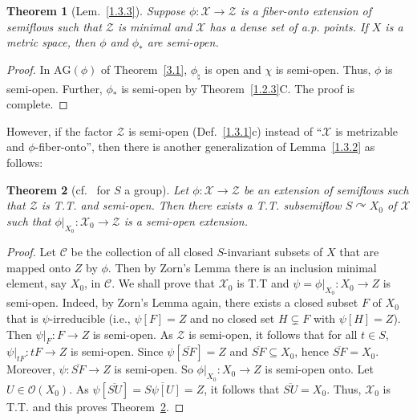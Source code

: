 \documentclass[12pt,final,3p,times]{elsarticle}
\newtheorem{thm}{Theorem}[section]
\theoremstyle{definition}
\numberwithin{equation}{section}
\begin{document}
\begin{thm}[Lem.~\ref{1.3.3}]\label{3.2}
Suppose $\phi\colon\mathscr{X}\rightarrow\mathscr{Z}$ is a fiber-onto extension of semiflows such that $\mathscr{Z}$ is minimal and $\mathscr{X}$ has a dense set of a.p. points. If $X$ is a metric space, then $\phi$ and $\phi_*$ are semi-open.
\end{thm}

\begin{proof}
    In $\mathrm{AG}(\phi)$ of Theorem~\ref{3.1}, $\phi_\natural$ is open and $\chi$ is semi-open. Thus, $\phi$ is semi-open. Further, $\phi_*$ is semi-open by Theorem~\ref{1.2.3}C. The proof is complete.
\end{proof}

However, if the factor $\mathscr{Z}$ is semi-open (Def.~\ref{1.3.1}c) instead of ``$\mathscr{X}$ is metrizable and $\phi$-fiber-onto'', then there is another generalization of Lemma~\ref{1.3.2} as follows:

\begin{thm}[{cf.~\cite[Thm.~2.5]{W85} for $S$ a group}]\label{3.3}
Let $\phi\colon\mathscr{X}\rightarrow \mathscr{Z}$ be an extension of semiflows such that $\mathscr{Z}$ is T.T. and semi-open. Then there exists a T.T. subsemiflow $S\curvearrowright X_0$ of $\mathscr{X}$ such that $\phi|_{X_0}\colon\mathscr{X}_0\rightarrow\mathscr{Z}$ is a semi-open extension.
\end{thm}

\begin{proof}
Let $\mathscr{C}$ be the collection of all closed $S$-invariant subsets of $X$ that are mapped onto $Z$ by $\phi$. Then by Zorn's Lemma there is an inclusion minimal element, say $X_0$, in $\mathscr{C}$. We shall prove that $\mathscr{X}_0$ is T.T and $\psi=\phi|_{X_0}\colon X_0\rightarrow Z$ is semi-open. Indeed, by Zorn's Lemma again, there exists a closed subset $F$ of $X_0$ that is $\psi$-irreducible (i.e., $\psi[F]=Z$ and no closed set $H\varsubsetneq F$ with $\psi[H]=Z$). Then $\psi|_F\colon F\rightarrow Z$ is semi-open. As $\mathscr{Z}$ is semi-open, it follows that for all $t\in S$, $\psi|_{tF}\colon tF\rightarrow Z$ is semi-open. Since $\psi[\overline{SF}]=Z$ and $\overline{SF}\subseteq X_0$, hence $\overline{SF}=X_0$. Moreover, $\psi\colon \overline{SF}\rightarrow Z$ is semi-open. So $\phi|_{X_0}\colon X_0\rightarrow Z$ is semi-open onto. Let $U\in\mathscr{O}(X_0)$. As $\psi[\overline{SU}]=\overline{S\psi[U]}=Z$, it follows that $\overline{SU}=X_0$. Thus, $\mathscr{X}_0$ is T.T. and this proves Theorem~\ref{3.3}.
\end{proof}
\end{document}
